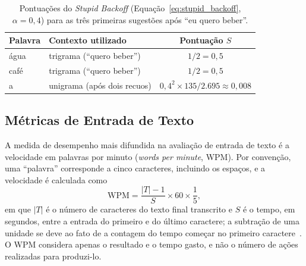 \begin{table}[htbp]
    \centering
    \caption{Pontuações do \textit{Stupid Backoff} (Equação~\ref{eq:stupid_backoff}, $\alpha = 0{,}4$) para as três primeiras sugestões após ``eu quero beber''.}
    \label{tab:stupid_backoff}
    \begin{tabular}{llc}
        \hline
        Palavra & Contexto utilizado & Pontuação $S$ \\
        \hline
        água & trigrama (``quero beber'') & $1/2 = 0{,}5$ \\
        café & trigrama (``quero beber'') & $1/2 = 0{,}5$ \\
        a & unigrama (após dois recuos) & $0{,}4^2 \times 135/2.695 \approx 0{,}008$ \\
        \hline
    \end{tabular}
\end{table}


\subsection{Métricas de Entrada de Texto} \label{sec:metricas}

A medida de desempenho mais difundida na avaliação de entrada de texto é a velocidade em palavras por minuto (\textit{words per minute}, WPM). Por convenção, uma ``palavra'' corresponde a cinco caracteres, incluindo os espaços, e a velocidade é calculada como
\begin{equation}
    \mathrm{WPM} = \frac{|T| - 1}{S} \times 60 \times \frac{1}{5},
    \label{eq:wpm}
\end{equation}
em que $|T|$ é o número de caracteres do texto final transcrito e $S$ é o tempo, em segundos, entre a entrada do primeiro e do último caractere; a subtração de uma unidade se deve ao fato de a contagem do tempo começar no primeiro caractere~\cite{wobbrock2007measures}. O WPM considera apenas o resultado e o tempo gasto, e não o número de ações realizadas para produzi-lo.

